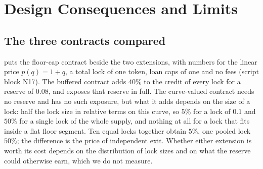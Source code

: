 \section{Design Consequences and Limits}\label{sec:consequences}

\subsection{The three contracts compared}\label{cr:compare}


 puts the floor-cap contract beside the two extensions, with numbers for the linear price $p(q)=1+q$, a total lock of one token, loan caps of one and no fees (script block N17). The buffered contract adds $40\%$ to the credit of every lock for a reserve of $0.08$, and exposes that reserve in full. The curve-valued contract needs no reserve and has no such exposure, but what it adds depends on the size of a lock: half the lock size in relative terms on this curve, so $5\%$ for a lock of $0.1$ and $50\%$ for a single lock of the whole supply, and nothing at all for a lock that fits inside a flat floor segment. Ten equal locks together obtain $5\%$, one pooled lock $50\%$; the difference is the price of independent exit. Whether either extension is worth its cost depends on the distribution of lock sizes and on what the reserve could otherwise earn, which we do not measure.

